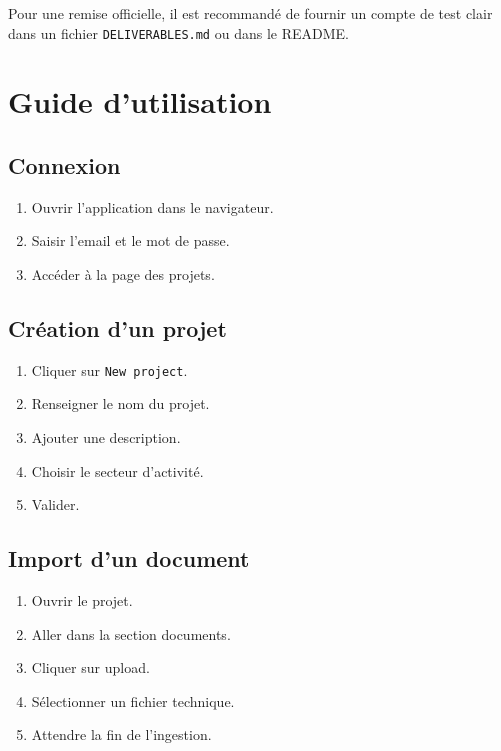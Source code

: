 \documentclass[
  french,
]{report}
\providecommand{\tightlist}{%
  \setlength{\itemsep}{0pt}\setlength{\parskip}{0pt}}
\begin{document}
Pour une remise officielle, il est recommandé de fournir un compte de
test clair dans un fichier \texttt{DELIVERABLES.md} ou dans le README.

\chapter{Guide d'utilisation}\label{guide-dutilisation}

\section{Connexion}\label{connexion}

\begin{enumerate}
\def\labelenumi{\arabic{enumi}.}
\tightlist
\item
  Ouvrir l'application dans le navigateur.
\item
  Saisir l'email et le mot de passe.
\item
  Accéder à la page des projets.
\end{enumerate}

\section{Création d'un projet}\label{cruxe9ation-dun-projet}

\begin{enumerate}
\def\labelenumi{\arabic{enumi}.}
\tightlist
\item
  Cliquer sur \texttt{New\ project}.
\item
  Renseigner le nom du projet.
\item
  Ajouter une description.
\item
  Choisir le secteur d'activité.
\item
  Valider.
\end{enumerate}

\section{Import d'un document}\label{import-dun-document}

\begin{enumerate}
\def\labelenumi{\arabic{enumi}.}
\tightlist
\item
  Ouvrir le projet.
\item
  Aller dans la section documents.
\item
  Cliquer sur upload.
\item
  Sélectionner un fichier technique.
\item
  Attendre la fin de l'ingestion.
\end{enumerate}
\end{document}

